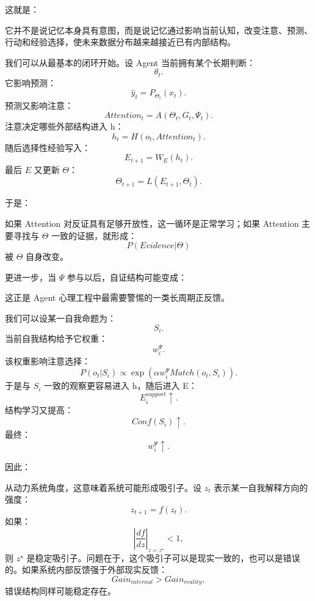 这就是：
\begin{statementbox}
\centering
{}
\end{statementbox}

它并不是说记忆本身具有意图，而是说记忆通过影响当前认知，改变注意、预测、行动和经验选择，使未来数据分布越来越接近已有内部结构。

我们可以从最基本的闭环开始。设 Agent 当前拥有某个长期判断：
\[
\theta_t.
\]
它影响预测：
\[
\hat y_t
=
P_{\Theta_t}(x_t).
\]
预测又影响注意：
\[
Attention_t
=
A(\Theta_t,G_t,\Psi_t).
\]
注意决定哪些外部结构进入 h：
\[
h_t
=
H(o_t,Attention_t).
\]
随后选择性经验写入：
\[
E_{t+1}
=
W_E(h_t).
\]
最后 $E$ 又更新 $\Theta$：
\[
\Theta_{t+1}
=
L(E_{t+1},\Theta_t).
\]

于是：
\begin{statementbox}
\centering
{}
\end{statementbox}

如果 Attention 对反证具有足够开放性，这一循环是正常学习；如果 Attention 主要寻找与 $\Theta$ 一致的证据，就形成：
\[
P(Evidence|\Theta)
\]
被 $\Theta$ 自身改变。

更进一步，当 $\Psi$ 参与以后，自证结构可能变成：
\begin{statementbox}
\centering
{}
\end{statementbox}

这正是 Agent 心理工程中最需要警惕的一类长周期正反馈。

我们可以设某一自我命题为：
\[
S_i.
\]
当前自我结构给予它权重：
\[
w_i^\Psi.
\]
该权重影响注意选择：
\[
P(o_t|S_i)
\propto
\exp
\left(
\alpha w_i^\Psi Match(o_t,S_i)
\right).
\]
于是与 $S_i$ 一致的观察更容易进入 h，随后进入 E：
\[
E_i^{support}\uparrow.
\]
结构学习又提高：
\[
Conf(S_i)\uparrow.
\]
最终：
\[
w_i^\Psi\uparrow.
\]

因此：
\begin{statementbox}
\centering
{}
\end{statementbox}

从动力系统角度，这意味着系统可能形成吸引子。设 $z_t$ 表示某一自我解释方向的强度：
\[
z_{t+1}
=
f(z_t).
\]
如果：
\[
\left|
\frac{df}{dz}
\right|_{z=z^\star}<1,
\]
则 $z^\star$ 是稳定吸引子。问题在于，这个吸引子可以是现实一致的，也可以是错误的。如果系统内部反馈强于外部现实反馈：
\[
Gain_{internal}
>
Gain_{reality},
\]
错误结构同样可能稳定存在。

